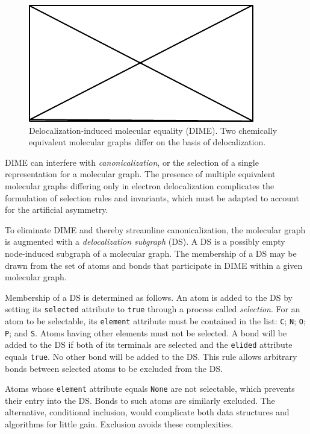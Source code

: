 \documentclass{article}
\def\ttt{\texttt}
\begin{document}
\begin{figure}
    \centering
    \includegraphics{filler}
    \caption{Delocalization-induced molecular equality (DIME). Two chemically equivalent molecular graphs differ on the basis of delocalization.}
    \label{fig:dime}
\end{figure}

DIME can interfere with \textit{canonicalization}, or the selection of a single representation for a molecular graph. The presence of multiple equivalent molecular graphs differing only in electron delocalization complicates the formulation of selection rules and invariants, which must be adapted to account for the artificial asymmetry.

To eliminate DIME and thereby streamline canonicalization, the molecular graph is augmented with a \textit{delocalization subgraph} (DS). A DS is a possibly empty node-induced subgraph of a molecular graph. The membership of a DS may be drawn from the set of atoms and bonds that participate in DIME within a given molecular graph.

Membership of a DS is determined as follows. An atom is added to the DS by setting its \ttt{selected} attribute to \ttt{true} through a process called \textit{selection}. For an atom to be selectable, its \ttt{element} attribute must be contained in the list: \ttt{C}; \ttt{N}; \ttt{O}; \ttt{P}; and \ttt{S}. Atoms having other elements must not be selected. A bond will be added to the DS if both of its terminals are selected and the \ttt{elided} attribute equals \ttt{true}. No other bond will be added to the DS. This rule allows arbitrary bonds between selected atoms to be excluded from the DS.

Atoms whose \ttt{element} attribute equals \ttt{None} are not selectable, which prevents their entry into the DS. Bonds to such atoms are similarly excluded. The alternative, conditional inclusion, would complicate both data structures and algorithms for little gain. Exclusion avoids these complexities.
\end{document}
